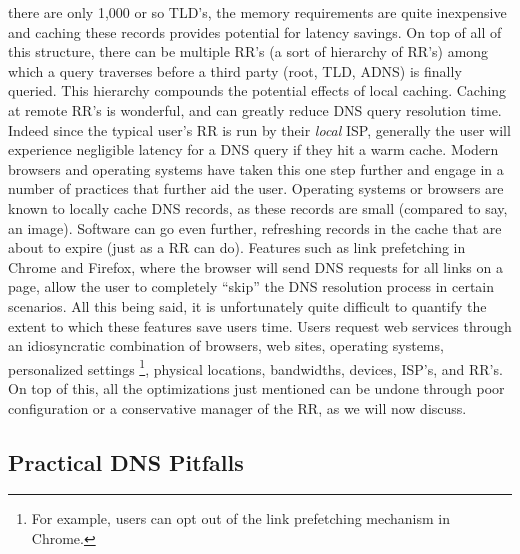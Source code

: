 \documentclass[sigconf,nonacm,10pt]{acmart}
\begin{document}
there are only 1,000 or so TLD's, the memory requirements are quite
inexpensive and caching these records provides potential for latency
savings. On top of all of this structure, there can be multiple RR's (a
sort of hierarchy of RR's) among which a query traverses before a third
party (root, TLD, ADNS) is finally queried. This hierarchy compounds the
potential effects of local caching. \break \break
Caching at remote RR's is wonderful, and can greatly reduce DNS query
resolution time. Indeed since the typical user's RR is run by their
\textit{local} ISP, generally the user will experience negligible
latency for a DNS query if they hit a warm cache. Modern browsers and
operating systems have taken this one step further and engage in a
number of practices that further aid the user. Operating systems or
browsers are known to locally cache DNS records, as these records are
small (compared to say, an image). Software can go even further,
refreshing records in the cache that are about to expire (just as a RR
can do). Features such as link prefetching in Chrome and Firefox, where
the browser will send DNS requests for all links on a page, allow the
user to completely ``skip'' the DNS resolution process in certain
scenarios. All this being said, it is unfortunately quite difficult to
quantify the extent to which these features save users time. Users
request web services through an idiosyncratic combination of browsers,
web sites, operating systems, personalized settings
\footnote{ For example, users can opt out of the link prefetching mechanism in Chrome. },
physical locations, bandwidths, devices, ISP's, and RR's. On top of
this, all the optimizations just mentioned can be undone through poor
configuration or a conservative manager of the RR, as we will now
discuss.

\subsection{Practical DNS Pitfalls}\label{practical-dns-pitfalls-1}
\end{document}
